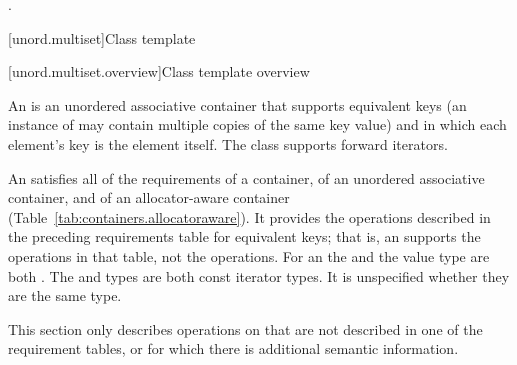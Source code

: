 \begin{itemdescr}
\pnum\effects {}.
\end{itemdescr}

[unord.multiset]{Class template }%

[unord.multiset.overview]{Class template  overview}

\pnum
{}%
%
An  is an unordered associative container
that supports equivalent keys (an instance of  may contain
multiple copies of the same key value) and in which each element's key
is the element itself.
The  class
supports forward iterators.

\pnum
An  satisfies all of the requirements of a container, of an
unordered associative container, and of an allocator-aware container
(Table~\ref{tab:containers.allocatoraware}). It provides the operations described in the
preceding requirements table for equivalent keys; that is, an 
supports the  operations in that table, not the  operations.
For an  the  and the value type are
both . The  and  types are both const
iterator types. It is unspecified whether they are the same type.

\pnum
This section only describes operations on  that
are not described in one of the requirement tables, or for which there
is additional semantic information.

